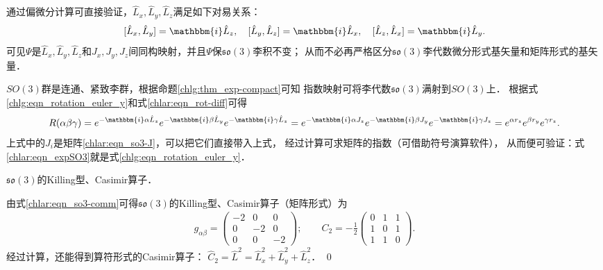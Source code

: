 通过偏微分计算可直接验证，$\hat{L}_x, \hat{L}_y, \hat{L}_z$满足如下对易关系：
\begin{equation}\label{chlar:eqn_so3-comm-L}
    [\hat{L}_x, \hat{L}_y] = \mathbbm{i} \hat{L}_z,\quad
    [\hat{L}_y, \hat{L}_z] = \mathbbm{i} \hat{L}_x,\quad
    [\hat{L}_z, \hat{L}_x] = \mathbbm{i} \hat{L}_y.
\end{equation}
可见$\Psi$是$\hat{L}_x, \hat{L}_y, \hat{L}_z$和$J_x, J_y, J_z$间同构映射，并且$\Psi$保$\mathfrak{so}(3)$李积不变；
从而不必再严格区分$\mathfrak{so}(3)$李代数微分形式基矢量和矩阵形式的基矢量．

$SO(3)$群是连通、紧致李群，根据命题\ref{chlg:thm_exp-compact}可知
指数映射可将李代数$\mathfrak{so}(3)$满射到$SO(3)$上．
根据式\eqref{chlg:eqn_rotation_euler_y}和式\eqref{chlar:eqn_rot-diff}可得
\begin{equation}\label{chlar:eqn_expSO3}
        R(\alpha\beta\gamma) %
        =e^{-\mathbbm{i} \alpha \hat{L}_z} e^{-\mathbbm{i}\beta \hat{L}_y} e^{-\mathbbm{i}\gamma \hat{L}_z}
        =e^{-\mathbbm{i} \alpha J_z} e^{-\mathbbm{i}\beta J_y} e^{-\mathbbm{i}\gamma J_z}
        =e^{\alpha r_z} e^{\beta r_y} e^{\gamma r_z} .
\end{equation}
上式中的$J_i$是矩阵\eqref{chlar:eqn_so3-J}，可以把它们直接带入上式，
经过计算可求矩阵的指数（可借助符号演算软件），
从而便可验证：式\eqref{chlar:eqn_expSO3}就是式\eqref{chlg:eqn_rotation_euler_y}．


\begin{example}\label{chlar:exm_so3-Killing-Casimir}
    $\mathfrak{so}(3)$的Killing型、Casimir算子．
\end{example}
由式\eqref{chlar:eqn_so3-comm}可得$\mathfrak{so}(3)$的Killing型、Casimir算子（矩阵形式）为
\begin{align*}
    g_{\alpha\beta}=\begin{pmatrix}
        -2 & 0 & 0 \\
        0 & -2 & 0 \\
        0 & 0 & -2 
    \end{pmatrix};\qquad
    C_{2}=-\frac{1}{2}\begin{pmatrix}
        0 & 1 & 1 \\
        1 & 0 & 1 \\
        1 & 1 & 0 
    \end{pmatrix}.
\end{align*}
经过计算，还能得到算符形式的Casimir算子：
$\hat{C}_2 = \hat{L}^2= \hat{L}_x^2+\hat{L}_y^2+\hat{L}_z^2$． 
\qed


